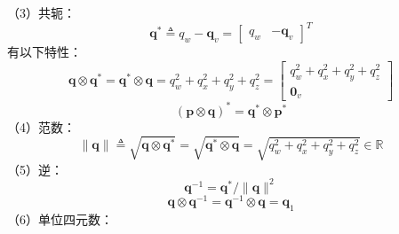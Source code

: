 （3）共轭：
\begin{equation}
\label{eqn:2.33}
\mathbf{q}^{*} \triangleq q_{w}-\mathbf{q}_{v}=\left[ \begin{array}{cc}{q_{w}} & {-\mathbf{q}_{v}}\end{array}\right]^T
\end{equation}
有以下特性：
\begin{equation}
\label{eqn:2.34}
\mathbf{q} \otimes \mathbf{q}^{*}=\mathbf{q}^{*} \otimes \mathbf{q}=q_{w}^{2}+q_{x}^{2}+q_{y}^{2}+q_{z}^{2}=\left[ \begin{array}{c}{q_{w}^{2}+q_{x}^{2}+q_{y}^{2}+q_{z}^{2}} \\ {\mathbf{0}_{v}}\end{array}\right]
\end{equation}
\begin{equation}
\label{eqn:2.35}
(\mathbf{p} \otimes \mathbf{q})^{*}=\mathbf{q}^{*} \otimes \mathbf{p}^{*}
\end{equation}
（4）范数：
\begin{equation}
\label{eqn:2.36}
\|\mathbf{q}\| \triangleq \sqrt{\mathbf{q} \otimes \mathbf{q}^{*}}=\sqrt{\mathbf{q}^{*} \otimes \mathbf{q}}=\sqrt{q_{w}^{2}+q_{x}^{2}+q_{y}^{2}+q_{z}^{2}} \in \mathbb{R}
\end{equation}
（5）逆：
\begin{equation}
\label{eqn:2.37}
\mathbf{q}^{-1}=\mathbf{q}^{*} /\|\mathbf{q}\|^{2}
\end{equation}
\begin{equation}
\label{eqn:2.38}
\mathbf{q} \otimes \mathbf{q}^{-1}=\mathbf{q}^{-1} \otimes \mathbf{q}=\mathbf{q}_{1}
\end{equation}
（6）单位四元数：

